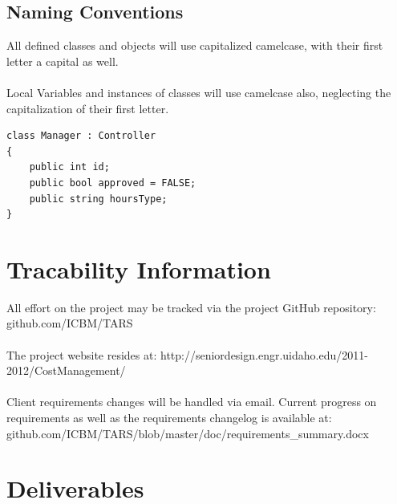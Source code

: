 \documentclass[letterpaper]{article}
\begin{document}
\subsection{Naming Conventions}
All defined classes and objects will use capitalized camelcase, with their first letter a capital as well.\\
\\
Local Variables and instances of classes will use camelcase also, neglecting the capitalization of their first letter.
\begin{verbatim}
class Manager : Controller
{
    public int id;
    public bool approved = FALSE;
    public string hoursType;
}
\end{verbatim}

\section{Tracability Information}
All effort on the project may be tracked via the project GitHub repository: github.com/ICBM/TARS\\
\\
The project website resides at: http://seniordesign.engr.uidaho.edu/2011-2012/CostManagement/\\
\\ 
Client requirements changes will be handled via email. Current progress on requirements as well as the requirements changelog is available at: github.com/ICBM/TARS/blob/master/doc/requirements\_summary.docx\\

\section{Deliverables}
\end{document}
